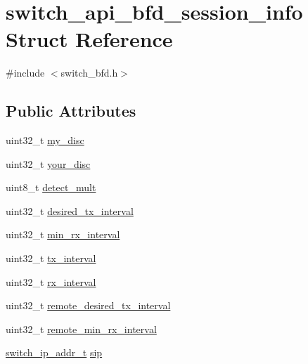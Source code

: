 \hypertarget{structswitch__api__bfd__session__info}{\section{switch\+\_\+api\+\_\+bfd\+\_\+session\+\_\+info Struct Reference}
\label{structswitch__api__bfd__session__info}
}


{\ttfamily \#include $<$switch\+\_\+bfd.\+h$>$}

\subsection*{Public Attributes}
\begin{DoxyCompactItemize}
\item 
uint32\+\_\+t \hyperlink{structswitch__api__bfd__session__info_a3f07e5a735b3b8e3afe6370fc6c9ff7c}{my\+\_\+disc}
\item 
uint32\+\_\+t \hyperlink{structswitch__api__bfd__session__info_a827865b7589bebff798bdfd1769aba8f}{your\+\_\+disc}
\item 
uint8\+\_\+t \hyperlink{structswitch__api__bfd__session__info_a8abafe90c3a7b32677dac541c94631d2}{detect\+\_\+mult}
\item 
uint32\+\_\+t \hyperlink{structswitch__api__bfd__session__info_aaad45ed96cc3d7f364bb1571c85eb36d}{desired\+\_\+tx\+\_\+interval}
\item 
uint32\+\_\+t \hyperlink{structswitch__api__bfd__session__info_a453e060bd3051cb4982780001b788494}{min\+\_\+rx\+\_\+interval}
\item 
uint32\+\_\+t \hyperlink{structswitch__api__bfd__session__info_a25c3bac5a8d2edf26f2d404721228866}{tx\+\_\+interval}
\item 
uint32\+\_\+t \hyperlink{structswitch__api__bfd__session__info_a641cced34f4033677301bbdd7544d37e}{rx\+\_\+interval}
\item 
uint32\+\_\+t \hyperlink{structswitch__api__bfd__session__info_ad75e9c93a0796c6a4d86500200cb6091}{remote\+\_\+desired\+\_\+tx\+\_\+interval}
\item 
uint32\+\_\+t \hyperlink{structswitch__api__bfd__session__info_a9488e6a39d8665a0e1e8922379b96b2d}{remote\+\_\+min\+\_\+rx\+\_\+interval}
\item 
\hyperlink{structswitch__ip__addr__s}{switch\+\_\+ip\+\_\+addr\+\_\+t} \hyperlink{structswitch__api__bfd__session__info_ac8b7c870da240ba95d21affa1727ae57}{sip}
\item 

\end{DoxyCompactItemize}
